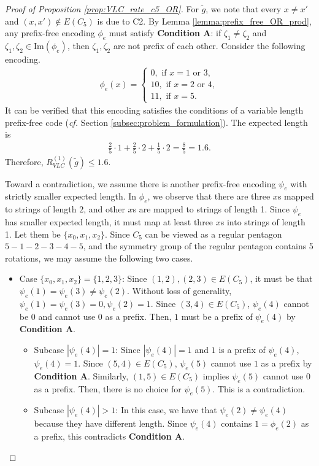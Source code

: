 \documentclass[journal, onecolumn, draftcls]{IEEEtran}
\theoremstyle{definition}
\newcommand{\meng}[1]{\marginpar{+}{\bf Ruoyu's remark}: {\em #1}}
\newcommand{\aditya}[1]{\marginpar{+}{\bf Aditya's remark}: {\em #1}}
\begin{document}
\begin{proof}[Proof of Proposition \ref{prop:VLC_rate_c5_OR}]
For $\tilde g$, we note that every $x\ne x'$ and $(x,x')\notin E(C_5)$ is due to C2.  By Lemma \ref{lemma:prefix_free_OR_prod}, any prefix-free encoding $\phi_e$ must satisfy \textbf{Condition A}: if $\zeta_1\ne \zeta_2$ and $\zeta_1,\zeta_2\in \text{Im}(\phi_e)$, then   $\zeta_1,\zeta_2$ are not prefix of each other. Consider the following encoding.
\begin{align*}
\phi_e(x) =\begin{cases}
    0,\text{ if }x=1\text{ or }3,\\
    10,\text{ if }x=2\text{ or }4,\\
    11,\text{ if }x=5.
\end{cases}
\end{align*} 
It can be verified that this encoding satisfies the conditions of a variable length prefix-free code ({\it cf.} Section \ref{subsec:problem_formulation}). The expected length is  
\begin{align*}
\frac{2}{5}\cdot 1 + \frac{2}{5}\cdot 2 + \frac{1}{5}\cdot 2  = \frac{8}{5} = 1.6.
\end{align*}
Therefore, $R_{VLC}^{(1)}(\tilde g) \le 1.6$. 

Toward a contradiction, we assume there is another prefix-free encoding $\psi_e$ with strictly smaller expected length.  In $\phi_e$, we observe that there are three $x$s mapped to strings of length $2$, and other $x$s are mapped to strings of length 1.   Since $\psi_e$ has smaller expected length, it must map at least three $x$s into strings of length 1. Let them be $\{x_0,x_1,x_2\}$. Since $C_5$ can be viewed as a regular pentagon $5-1-2-3-4-5$, and the symmetry group of the regular pentagon contains 5 rotations, we may assume the following two cases.

\begin{itemize}
    \item Case $\{x_0,x_1,x_2\}=\{1,2,3\}$: Since $(1,2),(2,3)\in E(C_5)$, it must be that $\psi_e(1)=\psi_e(3)\ne \psi_e(2)$. Without loss of generality, $\psi_e(1)=\psi_e(3)=0,\psi_e(2)=1.$ Since $(3,4)\in E(C_5)$, $\psi_e(4)$ cannot be $0$ and cannot use $0$ as a prefix. Then, $1$ must be a prefix of $\psi_e(4)$ by \textbf{Condition A}.
\begin{itemize}
    \item  Subcase $|\psi_e(4)|=1$: Since $|\psi_e(4)|=1$ and $1$ is a prefix of $\psi_e(4)$, $\psi_e(4)=1$.  Since $(5,4)\in E(C_5)$, $\psi_e(5)$  cannot use $1$ as a prefix by \textbf{Condition A}. Similarly, $(1,5)\in E(C_5)$ implies $\psi_e(5)$  cannot use $0$ as a prefix. Then, there is no choice for $\psi_e(5)$. This is a contradiction.
    \item  Subcase $|\psi_e(4)|>1$: In this case, we have that $\psi_e(2)\ne \psi_e(4)$ because they have different length. Since  $\psi_e(4)$ contains $1=\phi_e(2)$ as a prefix, this contradicts  \textbf{Condition A}. 


\end{itemize}
\end{itemize}
\end{proof}
\end{document}

